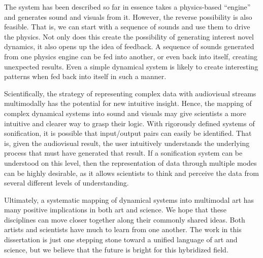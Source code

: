 The system has been described so far in essence takes a physics-based ``engine'' and generates sound and visuals from it. However, the reverse possibility is also feasible. That is, we can start with a sequence of sounds and use them to drive the physics. Not only does this create the possibility of generating interest novel dynamics, it also opens up the idea of feedback. A sequence of sounds generated from one physics engine can be fed into another, or even back into itself, creating unexpected results. Even a simple dynamical system is likely to create interesting patterns when fed back into itself in such a manner.

Scientifically, the strategy of representing complex data with audiovisual streams multimodally has the potential for new intuitive insight. Hence, the mapping of complex dynamical systems into sound and visuals may give scientists a more intuitive 
and clearer way to grasp their logic. With rigorously defined systems of sonification, it is possible that input/output pairs can easily be identified. That is, given the audiovisual result, the user intuitively understands the underlying process that must have generated that result. If a sonification system can be understood on this level, then the representation of data through multiple modes can be highly desirable, as it allows scientists to think and perceive the data from several different levels of understanding. 

Ultimately, a systematic mapping of dynamical systems into multimodal art has many positive implications in both art and science. We hope that these disciplines can move closer together along their commonly shared ideas. Both artists and scientists have much to learn from one another. The work in this dissertation is just one stepping stone toward a unified language of art and science, but we believe that the future is bright for this hybridized field. 